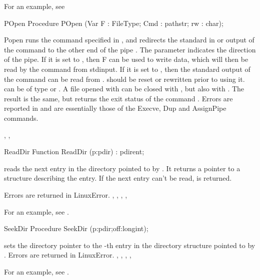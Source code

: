 For an example, see 
\begin{procedure}{POpen}
\Declaration
Procedure POpen (Var F : FileType; Cmd : pathstr; rw : char);

\Description
 Popen runs the command specified in ,
 and redirects the standard in or output of the
command to the other end of the pipe . The parameter 
indicates the direction of the pipe. If it is set to , then F can
be used to write data, which will then be read by the command from stdinput.
If it is set to , then the standard output of the command can be 
read from .  should be reset or rewritten prior to using it.
 can be of type  or .
A file opened with  can be closed with , but also
with . The result is the same, but  returns the
exit status of the command .
\Errors
Errors are reported in  and are essentially those of the
Execve, Dup and AssignPipe commands.

\SeeAlso
{}, , 
\end{procedure}
\latex{}
\html{}
\begin{function}{ReadDir}
\Declaration
Function ReadDir (p:pdir) : pdirent;

\Description
{} reads the next entry in the directory pointed to by .
It returns a  pointer to a structure describing the entry.
If the next entry can't be read,  is returned.

\Errors
Errors are returned in LinuxError.
\SeeAlso
{}, , , ,
\end{function}
For an example, see .
\begin{procedure}{SeekDir}
\Declaration
Procedure SeekDir (p:pdir;off:longint);

\Description
  sets the directory pointer to the -th entry in the
directory structure pointed to by .
\Errors
Errors are returned in LinuxError.
\SeeAlso
{}, , , ,
\end{procedure}
For an example, see .
